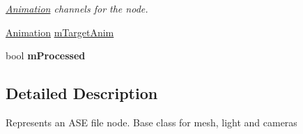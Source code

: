 \begin{DoxyCompactItemize}
\begin{DoxyCompactList}\small\item\em \hyperlink{struct_assimp_1_1_a_s_e_1_1_animation}{Animation} channels for the node. \end{DoxyCompactList}\item 
\hyperlink{struct_assimp_1_1_a_s_e_1_1_animation}{Animation} \hyperlink{struct_assimp_1_1_a_s_e_1_1_base_node_a414f10a3fca66246abf5e111414d90b0}{m\+Target\+Anim}
\item 
\hypertarget{struct_assimp_1_1_a_s_e_1_1_base_node_a36a4bfc678fc6d9506cb266ddb59601c}{bool {\bfseries m\+Processed}}\label{struct_assimp_1_1_a_s_e_1_1_base_node_a36a4bfc678fc6d9506cb266ddb59601c}

\end{DoxyCompactItemize}


\subsection{Detailed Description}
Represents an A\+S\+E file node. Base class for mesh, light and cameras 

